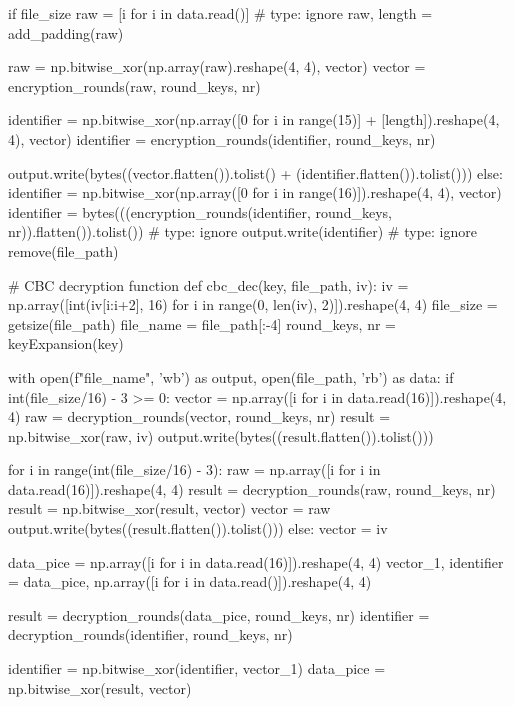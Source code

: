\begin{python}
        if file_size %
            raw = [i for i in data.read()]  # type: ignore
            raw, length = add_padding(raw)

            raw = np.bitwise_xor(np.array(raw).reshape(4, 4), vector)
            vector = encryption_rounds(raw, round_keys, nr)

            identifier = np.bitwise_xor(np.array([0 for i in range(15)] + [length]).reshape(4, 4), vector)
            identifier = encryption_rounds(identifier, round_keys, nr)

            output.write(bytes((vector.flatten()).tolist() + (identifier.flatten()).tolist()))
        else:
            identifier = np.bitwise_xor(np.array([0 for i in range(16)]).reshape(4, 4), vector)
            identifier = bytes(((encryption_rounds(identifier, round_keys, nr)).flatten()).tolist())  # type: ignore
            output.write(identifier)  # type: ignore
    remove(file_path)


# CBC decryption function
def cbc_dec(key, file_path, iv):
    iv = np.array([int(iv[i:i+2], 16) for i in range(0, len(iv), 2)]).reshape(4, 4)
    file_size = getsize(file_path)
    file_name = file_path[:-4]
    round_keys, nr = keyExpansion(key)

    with open(f"{file_name}", 'wb') as output, open(file_path, 'rb') as data:
        if int(file_size/16) - 3 >= 0:
            vector = np.array([i for i in data.read(16)]).reshape(4, 4)
            raw = decryption_rounds(vector, round_keys, nr)
            result = np.bitwise_xor(raw, iv)
            output.write(bytes((result.flatten()).tolist()))

            for i in range(int(file_size/16) - 3):
                raw = np.array([i for i in data.read(16)]).reshape(4, 4)
                result = decryption_rounds(raw, round_keys, nr)
                result = np.bitwise_xor(result, vector)
                vector = raw
                output.write(bytes((result.flatten()).tolist()))
        else:
            vector = iv

        data_pice = np.array([i for i in data.read(16)]).reshape(4, 4)
        vector_1, identifier = data_pice, np.array([i for i in data.read()]).reshape(4, 4)

        result = decryption_rounds(data_pice, round_keys, nr)
        identifier = decryption_rounds(identifier, round_keys, nr)

        identifier = np.bitwise_xor(identifier, vector_1)
        data_pice = np.bitwise_xor(result, vector)


\end{python}
